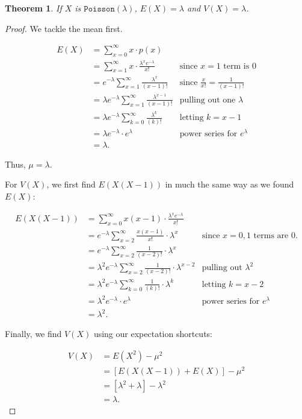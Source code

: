 \documentclass[
]{book}
\newtheorem{theorem}{Theorem}[chapter]
\theoremstyle{definition}
\theoremstyle{definition}
\theoremstyle{definition}
\theoremstyle{definition}
\theoremstyle{remark}
\begin{document}
\begin{theorem}
\protect\hypertarget{thm:poisson-EandV}{}\label{thm:poisson-EandV}If \(X\) is \(\texttt{Poisson}(\lambda)\), \(E(X) = \lambda\) and \(V(X) = \lambda\).
\end{theorem}

\begin{proof}
We tackle the mean first.

\begin{align*} 
E(X) &= \sum_{x=0}^\infty x \cdot p(x) \\
     &= \sum_{x=1}^\infty x \cdot \frac{\lambda^x e^{-\lambda}}{x!} & \text{since }x=1 \text{ term is } 0\\
     &= e^{-\lambda} \sum_{x=1}^\infty \frac{\lambda^x}{(x-1)!} & \text{since } \frac{x}{x!}=\frac{1}{(x-1)!}\\
     &= \lambda e^{-\lambda} \sum_{x=1}^\infty \frac{\lambda^{x-1}}{(x-1)!} & \text{pulling out one }\lambda \\
     &= \lambda e^{-\lambda} \sum_{k=0}^\infty \frac{\lambda^{k}}{(k)!} & \text{letting }  k = x-1\\
     &= \lambda e^{-\lambda}\cdot e^{\lambda} &\text{power series for }e^\lambda\\
     &= \lambda.
\end{align*}

Thus, \(\mu = \lambda\).

For \(V(X)\), we first find \(E(X(X-1))\) in much the same way as we found \(E(X)\):

\begin{align*}
E(X(X-1)) &= \sum_{x=0}^\infty x(x-1)\cdot \frac{\lambda^x e^{-\lambda}}{x!} \\
    &= e^{-\lambda} \sum_{x=2}^\infty \frac{x(x-1)}{x!} \cdot \lambda^x & \text{since }x=0,1 \text{ terms are }0. \\
    &= e^{-\lambda} \sum_{x=2}^\infty \frac{1}{(x-2)!} \cdot \lambda^x\\
    &= \lambda^2 e^{-\lambda} \sum_{x=2}^\infty \frac{1}{(x-2)!} \cdot \lambda^{x-2}  & \text{pulling out }\lambda^2 \\
    &= \lambda^2 e^{-\lambda} \sum_{k=0}^\infty \frac{1}{(k)!} \cdot \lambda^{k} &\text{letting }k=x-2\\
    &= \lambda^2 e^{-\lambda} \cdot e^{\lambda}  & \text{power series for }e^\lambda\\
    &= \lambda^2.
\end{align*}

Finally, we find \(V(X)\) using our expectation shortcuts:

\begin{align*}
V(X) &= E(X^2) - \mu^2 \\
  &= [E(X(X-1))+E(X)] - \mu^2 \\
  &= [\lambda^2 + \lambda] - \lambda^2 \\
  &= \lambda.
\end{align*}
\end{proof}
\end{document}
